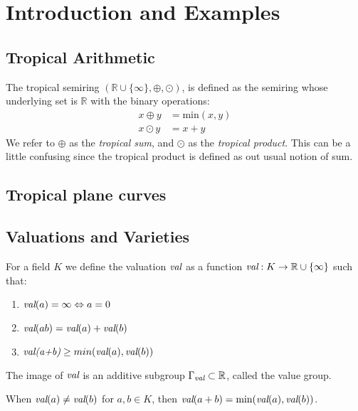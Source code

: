 \section{Introduction and Examples}
\subsection{Tropical Arithmetic}
    \begin{definition} The tropical semiring $(\mathbb{R} \cup \{\infty\}, \oplus, \odot)$, is defined as the semiring whose underlying set is $\mathbb{R}$ with the binary operations: 
        \begin{align*}
            x \oplus y &= \text{min}(x,y)\\
            x \odot y  &= x + y
        \end{align*}
    We refer to $\oplus$ as the \textit{tropical sum}, and $\odot$ as the \textit{tropical product}. This can be a little confusing since the tropical product is defined as out usual notion of sum.
    \end{definition}

\subsection{Tropical plane curves}
\subsection{Valuations and Varieties}
    \begin{definition}
        For a field $K$ we define the valuation $\emph{val}$ as a function $\emph{val}: K \to \mathbb{R}\cup \{\infty\}$ such that:
        \begin{enumerate}
            \item $\emph{val}(a) = \infty \Leftrightarrow a = 0$
            \item $\emph{val}(ab) = \emph{val}(a)+ \emph{val}(b)$
            \item $\emph{val(a+b)} \geq min(\emph{val}(a),\emph{val}(b))$
        \end{enumerate}
        The image of $\emph{val}$ is an additive subgroup $\Gamma_{\emph{val}} \subset \mathbb{R}$, called the value group.
    \end{definition}

    \begin{lemma}
        \label{vallemma}
        When $\emph{val}(a) \neq \emph{val}(b)$ for $a,b \in K$, then $\emph{val}(a+b)= \text{min}(\emph{val}(a),\emph{val}(b))$.
    \end{lemma}

